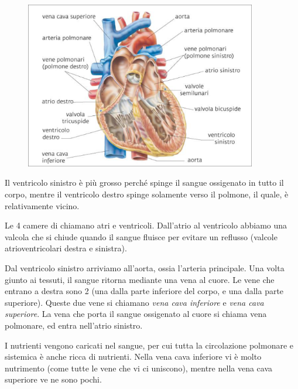 \documentclass[a4paper]{article}
\begin{document}
\begin{center}
\begin{figure}[th]
    \centering
    \includegraphics[width=0.9\textwidth]{./heart.png}
\end{figure}
\end{center}

Il ventricolo sinistro è più grosso perché spinge il sangue ossigenato in tutto il corpo,
mentre il ventricolo destro spinge solamente verso il polmone, il quale, è relativamente vicino.

Le 4 camere di chiamano atri e ventricoli.
Dall'atrio al ventricolo abbiamo una valcola che si chiude quando il sangue fluisce
per evitare un reflusso (valcole atrioventricolari destra e sinistra).

Dal ventricolo sinistro arriviamo all'aorta, ossia l'arteria principale.
Una volta giunto ai tessuti, il sangue ritorna mediante una vena al cuore.
Le vene che entrano a destra sono 2 (una dalla parte inferiore del corpo, e una dalla parte superiore).
Queste due vene si chiamano \textit{vena cava inferiore} e \textit{vena cava superiore}.
La vena che porta il sangue ossigenato al cuore si chiama vena polmonare, ed entra nell'atrio sinistro.


I nutrienti vengono caricati nel sangue, per cui tutta la circolazione polmonare e sistemica
è anche ricca di nutrienti. Nella vena cava inferiore vi è molto nutrimento
(come tutte le vene che vi ci uniscono), mentre nella vena cava superiore ve ne sono pochi.

\end{document}
